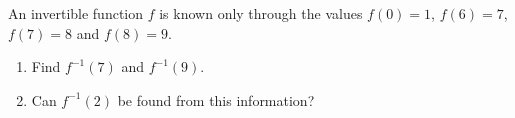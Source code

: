 An invertible function $f$ is known only through the values $f(0)=1$, $f(6)=7$, $f(7)=8$ and $f(8)=9$.
\begin{enumerate}
\item[(a)] Find $f^{-1}(7)$ and $f^{-1}(9)$.
\item[(b)] Can $f^{-1}(2)$ be found from this information?
\end{enumerate}
